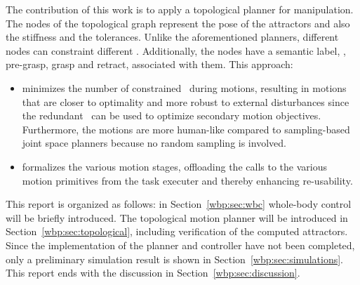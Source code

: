 The contribution of this work is to apply a topological planner for manipulation. The nodes of the topological graph represent the pose of the attractors and also the stiffness and the tolerances. 
Unlike the aforementioned planners, different nodes can constraint different \dofs. Additionally, the nodes have a semantic label, \eg, pre-grasp, grasp and retract, associated with them.
This approach:
\begin{itemize}
    \item minimizes the number of constrained \dofs\ during motions, resulting in motions that are closer to optimality and more robust to external disturbances since the redundant \dofs\ can be used to optimize secondary motion objectives. Furthermore, the motions are more human-like compared to sampling-based joint space planners because no random sampling is involved. 
    \item formalizes the various motion stages, offloading the calls to the various motion primitives from the task executer and thereby enhancing re-usability.
\end{itemize}

This report is organized as follows: 
in Section~\ref{wbp:sec:wbc} whole-body control will be briefly introduced. The topological motion planner will be introduced in Section~\ref{wbp:sec:topological}, including verification of the computed attractors.
Since the implementation of the planner and controller have not been completed, only a preliminary simulation result is shown in Section~\ref{wbp:sec:simulations}. This report ends with the discussion in Section~\ref{wbp:sec:discussion}.


